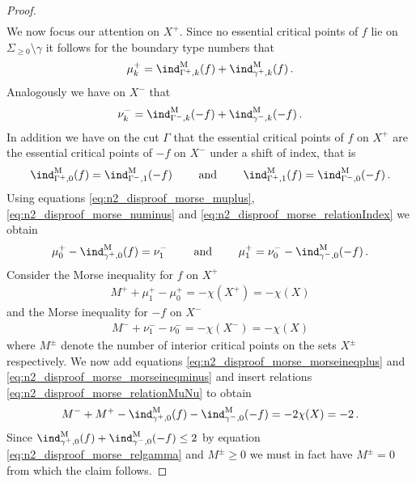 \begin{proof}
\begin{align}
  \end{align}
  We now focus our attention on $X^+$. Since no essential critical points of $f$ lie on $\Sigma_{\geq0}\setminus\gamma$
  it follows for the boundary type numbers that
  \begin{align}
    \mu^+_k=\ind^\text{M}_{\Gamma^+,k}(f)+\ind^\text{M}_{\gamma^+,k}(f)\,.\label{eq:n2_disproof_morse_muplus}
  \end{align}
  Analogously we have on $X^-$ that
  \begin{align}
    \nu^-_k=\ind^\text{M}_{\Gamma^-,k}(-f)+\ind^\text{M}_{\gamma^-,k}(-f)\,.\label{eq:n2_disproof_morse_numinus}
  \end{align}
  In addition we have on the cut $\Gamma$ that the essential critical points of $f$ on $X^+$ are the
  essential critical points of $-f$ on $X^-$ under a shift of index, that is
  \begin{align}
    \ind^\text{M}_{\Gamma^+,0}(f)=\ind^\text{M}_{\Gamma^-,1}(-f)\qquad\text{ and }\qquad 
    \ind^\text{M}_{\Gamma^+,1}(f)=\ind^\text{M}_{\Gamma^-,0}(-f)\,.\label{eq:n2_disproof_morse_relationIndex} 
  \end{align}
  Using equations \eqref{eq:n2_disproof_morse_muplus}, \eqref{eq:n2_disproof_morse_numinus} and \eqref{eq:n2_disproof_morse_relationIndex}
  we obtain
  \begin{align}
    \mu^+_0-\ind^\text{M}_{\gamma^+,0}(f)=\nu^-_1 \qquad\text{ and }\qquad
    \mu^+_1=\nu^-_0-\ind^\text{M}_{\gamma^-,0}(-f)\,.\label{eq:n2_disproof_morse_relationMuNu}
  \end{align}
  Consider the Morse inequality for $f$ on $X^+$
  \begin{align}
    M^++\mu^+_1-\mu^+_0=-\chi(X^+)=-\chi(X)\label{eq:n2_disproof_morse_morseineqplus}
  \end{align}
  and the Morse inequality for $-f$ on $X^-$
  \begin{align}
    M^-+\nu^-_1-\nu^-_0=-\chi(X^-)=-\chi(X)\label{eq:n2_disproof_morse_morseineqminus}
  \end{align}
  where $M^\pm$ denote the number of interior critical points on the sets $X^\pm$ respectively.
  We now add equations \eqref{eq:n2_disproof_morse_morseineqplus} and \eqref{eq:n2_disproof_morse_morseineqminus}
  and insert relations \eqref{eq:n2_disproof_morse_relationMuNu} to obtain
  \begin{align*}
    M^-+M^+-\ind^\text{M}_{\gamma^+,0}(f)-\ind^\text{M}_{\gamma^-,0}(-f)=-2\chi(X)=-2\,.
  \end{align*}
  Since $\ind^\text{M}_{\gamma^+,0}(f)+\ind^\text{M}_{\gamma^-,0}(-f)\leq2$ by equation \eqref{eq:n2_disproof_morse_relgamma} and $M^\pm\geq0$ we must in fact have $M^\pm=0$ from which the claim follows.


\end{proof}
